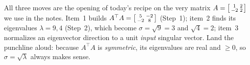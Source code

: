 \documentclass[10pt]{article}
\newcommand{\T}{^{\top}}
\begin{document}
\begin{teachernote}
All three moves are the opening of today's recipe on the very matrix $A=\begin{bsmallmatrix} 1 & 2\\ -2 & 2 \end{bsmallmatrix}$
we use in the notes. Item~1 builds $A\T A=\begin{bsmallmatrix} 5 & -2\\ -2 & 8 \end{bsmallmatrix}$ (Step~1);
item~2 finds its eigenvalues $\lambda=9,4$ (Step~2), which become $\sigma=\sqrt9=3$ and $\sqrt4=2$;
item~3 normalizes an eigenvector direction to a unit \emph{input} singular vector. Land the punchline
aloud: because $A\T A$ is \emph{symmetric}, its eigenvalues are real and $\ge0$, so $\sigma=\sqrt{\lambda}$
always makes sense.
\end{teachernote}
\end{document}
